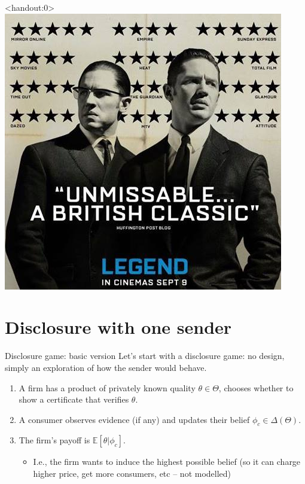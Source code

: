\documentclass[english,10pt
,aspectratio=169
]{beamer}
\begin{document}
\begin{frame}<handout:0>
	\centering
	\includegraphics[scale=0.5]{pics/M8/reviews_guardian}
\end{frame}


\section{Disclosure with one sender}

\begin{frame}{Disclosure game: basic version \citep{grossman_informational_1981}}
	Let's start with a \alert{disclosure game}: no design, simply an exploration of how the sender would behave.
	\begin{enumerate}[<+->]
		\item A firm has a product of privately known quality $\theta \in \Theta$, chooses whether to show a certificate that verifies $\theta$.
		
		\item A consumer observes evidence (if any) and updates their belief $\phi_c \in \varDelta(\Theta)$.
		
		\item The firm's payoff is $\mathbb{E}[\theta | \phi_c]$.
		\begin{itemize}
			\item I.e., the firm wants to induce the highest possible belief (so it can charge higher price, get more consumers, etc -- not modelled)
		\end{itemize}
	\end{enumerate}
\end{frame}
\end{document}
